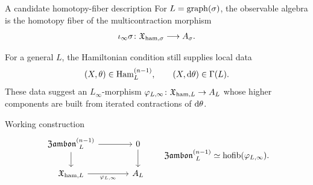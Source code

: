 \documentclass[beamer,10pt]{standalone}
\begin{document}
\begin{frame}{A candidate homotopy-fiber description}
  For $L=\operatorname{graph}(\sigma)$, the observable algebra is the homotopy fiber of the
  multicontraction morphism
  \[
    \iota_\infty\sigma\colon\mathfrak{X}_{\text{ham},\sigma}\longrightarrow A_\sigma.
  \]

  \vfill\pause
  For a general $L$, the Hamiltonian condition still supplies local data
  \[
    (X,\theta)\in\text{Ham}_L^{(n-1)},
    \qquad (X,\mathrm{d}\theta)\in\Gamma(L).
  \]
  These data suggest an $L_\infty$-morphism
  $\varphi_{L,\infty}\colon\mathfrak{X}_{\text{ham},L}\to A_L$ whose higher components are
  built from iterated contractions of $\mathrm{d}\theta$.

  \vfill\pause
  \begin{block}{Working construction}
    \[
      \begin{tikzcd}[ampersand replacement=\&,column sep=large]
        \Zambon[L]{n-1} \ar[r] \ar[d]
          \& 0 \ar[d] \\
        \X_{\ham,L} \ar[r,"\varphi_{L,\infty}"']
          \& A_L
      \end{tikzcd}
      \qquad
      \Zambon[L]{n-1}\simeq\hofib(\varphi_{L,\infty}).
    \]
  \end{block}
\end{frame}
\end{document}
